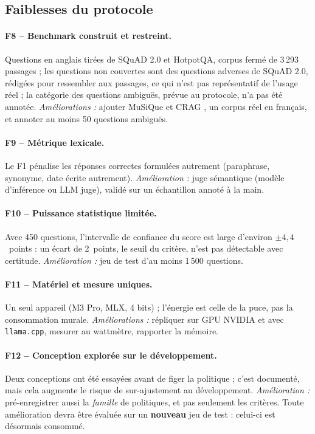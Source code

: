 \documentclass[11pt,a4paper]{article}
\begin{document}
\subsection{Faiblesses du protocole}

\paragraph{F8 -- Benchmark construit et restreint.} Questions en anglais tirées de SQuAD 2.0 et
HotpotQA, corpus fermé de 3\,293 passages ; les questions non couvertes sont des questions adverses de
SQuAD 2.0, rédigées pour ressembler aux passages, ce qui n'est pas représentatif de l'usage réel ; la
catégorie des questions ambiguës, prévue au protocole, n'a pas été annotée.
\emph{Améliorations :} ajouter MuSiQue \citep{trivedi2022musique} et CRAG \citep{yang2024cragbench},
un corpus réel en français, et annoter au moins 50 questions ambiguës.

\paragraph{F9 -- Métrique lexicale.} Le F1 pénalise les réponses correctes formulées autrement (paraphrase,
synonyme, date écrite autrement). \emph{Amélioration :} juge sémantique (modèle d'inférence
ou LLM juge), validé sur un échantillon annoté à la main.

\paragraph{F10 -- Puissance statistique limitée.} Avec 450 questions, l'intervalle de confiance du score
est large d'environ $\pm 4{,}4$~points : un écart de 2~points, le seuil du critère, n'est pas
détectable avec certitude. \emph{Amélioration :} jeu de test d'au moins 1\,500 questions.

\paragraph{F11 -- Matériel et mesure uniques.} Un seul appareil (M3 Pro, MLX, 4 bits) ; l'énergie est
celle de la puce, pas la consommation murale. \emph{Améliorations :} répliquer sur GPU NVIDIA et avec
\texttt{llama.cpp}, mesurer au wattmètre, rapporter la mémoire.

\paragraph{F12 -- Conception explorée sur le développement.} Deux conceptions ont été essayées avant de
figer la politique ; c'est documenté, mais cela augmente le risque de sur-ajustement au développement.
\emph{Amélioration :} pré-enregistrer aussi la \emph{famille} de politiques, et pas seulement les
critères. Toute amélioration devra être évaluée sur un \textbf{nouveau} jeu de test : celui-ci est
désormais consommé.
\end{document}
